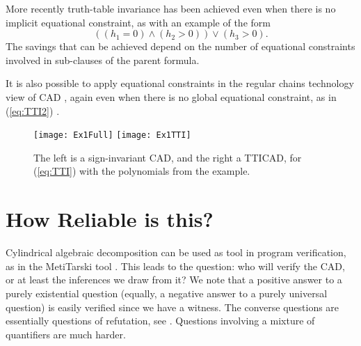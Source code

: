 \documentclass[runningheads,a4paper]{llncs}
\begin{document}
\vspace*{0.1in}

More recently \cite{Bradfordetal2014a} truth-table invariance has been achieved even when there is no implicit equational constraint, as with an example of the form 
\begin{equation}\label{eq:TTI2}
\left((h_1=0)\land (h_2>0)\right)\lor(h_3>0).
\end{equation}
The savings that can be achieved depend on the number of equational constraints involved in sub-clauses of the parent formula.
\par
It is also possible to apply equational constraints in the regular chains technology view of CAD \cite{ChenMorenoMaza2012a}, again even when there is no global equational constraint, as in (\ref{eq:TTI2}) \cite{Bradfordetal2014b}. 

\begin{figure}[t]
\caption{The left is a sign-invariant CAD, and the right a TTICAD, for (\ref{eq:TTI}) with the polynomials from the example.}
\label{fig:Ex1}
\centering
\texttt{[image: Ex1Full]}
\hspace*{0.02\textwidth}
\texttt{[image: Ex1TTI]}
\end{figure}

\section{How Reliable is this?}

Cylindrical algebraic decomposition can be used as tool in program verification, as in the MetiTarski tool \cite{Paulson2012b}. This leads to the question: who will verify the CAD, or at least the inferences we draw from it?  We note that a positive answer to a purely existential question (equally, a negative answer to a purely universal question) is easily verified since we have a witness. The converse questions are essentially questions of refutation, see \cite{JovanovicdeMoura2012a}. Questions involving a mixture of quantifiers are much harder.
\end{document}
